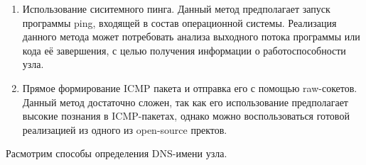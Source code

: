 \documentclass[a4paper]{article}
\begin{document}
			\begin{enumerate}
				\item Использование сиситемного пинга. Данный метод предполагает запуск программы ping, входящей в состав операционной системы. Реализация данного метода может потребовать анализа выходного потока программы или кода её завершения, с целью получения информации о работоспособности узла.
				\item Прямое формирование ICMP пакета и отправка его с помощью raw-сокетов. Данный метод достаточно сложен, так как его использование предполагает высокие познания в ICMP-пакетах, однако можно воспользоваться готовой реализацией из одного из open-source пректов.	
			\end{enumerate}
			 
			
			
			Расмотрим способы определения DNS-имени узла.
			
\end{document}
